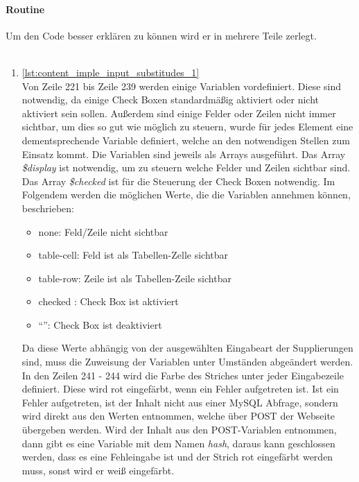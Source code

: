 \paragraph{Routine\\}
Um den Code besser erklären zu können wird er in mehrere Teile zerlegt.\\
\\
\begin{enumerate}
	\item \autoref{lst:content_imple_input_substitudes_1}\\
	Von Zeile 221 bis Zeile 239 werden einige Variablen vordefiniert. Diese sind notwendig, da einige Check Boxen standardmäßig aktiviert oder nicht aktiviert sein sollen. Außerdem sind einige Felder oder Zeilen nicht immer sichtbar, um dies so gut wie möglich zu steuern, wurde für jedes Element eine dementsprechende Variable definiert, welche an den notwendigen Stellen zum Einsatz kommt. Die Variablen sind jeweils als Arrays ausgeführt. Das Array \textit{\$display} ist notwendig, um zu steuern welche Felder und Zeilen sichtbar sind. Das Array \textit{\$checked} ist für die Steuerung der Check Boxen notwendig.
	Im Folgendem werden die möglichen Werte, die die Variablen annehmen können, beschrieben:
	\begin{itemize}
		\item none: Feld/Zeile nicht sichtbar
		\item table-cell: Feld ist als Tabellen-Zelle sichtbar
		\item table-row: Zeile ist als Tabellen-Zeile sichtbar
		\item checked : Check Box ist aktiviert
		\item \enquote{}: Check Box ist deaktiviert
	\end{itemize}
	Da diese Werte abhängig von der ausgewählten Eingabeart der Supplierungen sind, muss die Zuweisung der Variablen unter Umständen abgeändert werden.\\
	In den Zeilen 241 - 244 wird die Farbe des Striches unter jeder Eingabezeile definiert. Diese wird rot eingefärbt, wenn ein Fehler aufgetreten ist. Ist ein Fehler aufgetreten, ist der Inhalt nicht aus einer MySQL Abfrage, sondern wird direkt aus den Werten entnommen, welche über POST der Webseite übergeben werden. Wird der Inhalt aus den POST-Variablen entnommen, dann gibt es eine Variable mit dem Namen \textit{hash}, daraus kann geschlossen werden, dass es eine Fehleingabe ist und der Strich rot eingefärbt werden muss, sonst wird er weiß eingefärbt.\\
	
	

\end{enumerate}

